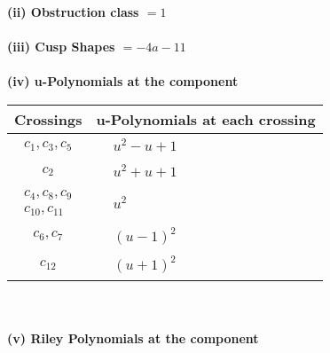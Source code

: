 \documentclass[1p]{elsarticle_modified}
\theoremstyle{definition}
\begin{document}
\flushleft \textbf{(ii) Obstruction class $= 1$}\\~\\
\flushleft \textbf{(iii) Cusp Shapes $= -4 a-11$}\\~\\
\newpage\renewcommand{\arraystretch}{1}
\flushleft \textbf{(iv) u-Polynomials at the component}\newline \\
\begin{tabular}{m{50pt}|m{274pt}}
Crossings & \hspace{64pt}u-Polynomials at each crossing \\
\hline $$\begin{aligned}c_{1},c_{3},c_{5}\end{aligned}$$&$\begin{aligned}
&u^2- u+1
\end{aligned}$\\
\hline $$\begin{aligned}c_{2}\end{aligned}$$&$\begin{aligned}
&u^2+u+1
\end{aligned}$\\
\hline $$\begin{aligned}c_{4},c_{8},c_{9}\\c_{10},c_{11}\end{aligned}$$&$\begin{aligned}
&u^2
\end{aligned}$\\
\hline $$\begin{aligned}c_{6},c_{7}\end{aligned}$$&$\begin{aligned}
&(u-1)^2
\end{aligned}$\\
\hline $$\begin{aligned}c_{12}\end{aligned}$$&$\begin{aligned}
&(u+1)^2
\end{aligned}$\\
\hline
\end{tabular}\\~\\
\newpage\renewcommand{\arraystretch}{1}
\flushleft \textbf{(v) Riley Polynomials at the component}\newline \\
\end{document}
